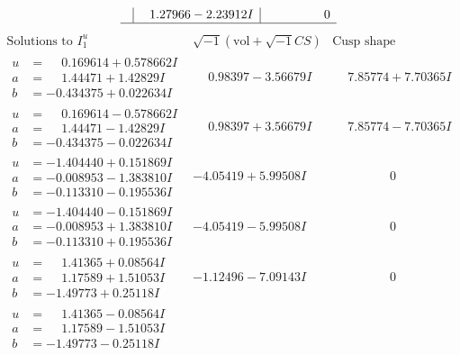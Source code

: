 \documentclass[1p]{elsarticle_modified}
\theoremstyle{definition}
\newcommand{\I}{\sqrt{-1}}
\begin{document}
$$\begin{array}{c|c|c}
 & \phantom{-}1.27966 - 2.23912 I & \phantom{-0.000000 } 0\\
 \hline 
 \end{array}$$\newpage$$\begin{array}{c|c|c}  
\text{Solutions to }I^u_{1}& \I (\text{vol} + \sqrt{-1}CS) & \text{Cusp shape}\\
 \hline 
\begin{aligned}
u &= \phantom{-}0.169614 + 0.578662 I \\
a &= \phantom{-}1.44471 + 1.42829 I \\
b &= -0.434375 + 0.022634 I\end{aligned}
 & \phantom{-}0.98397 - 3.56679 I & \phantom{-}7.85774 + 7.70365 I \\ \hline\begin{aligned}
u &= \phantom{-}0.169614 - 0.578662 I \\
a &= \phantom{-}1.44471 - 1.42829 I \\
b &= -0.434375 - 0.022634 I\end{aligned}
 & \phantom{-}0.98397 + 3.56679 I & \phantom{-}7.85774 - 7.70365 I \\ \hline\begin{aligned}
u &= -1.404440 + 0.151869 I \\
a &= -0.008953 - 1.383810 I \\
b &= -0.113310 - 0.195536 I\end{aligned}
 & -4.05419 + 5.99508 I & \phantom{-0.000000 } 0 \\ \hline\begin{aligned}
u &= -1.404440 - 0.151869 I \\
a &= -0.008953 + 1.383810 I \\
b &= -0.113310 + 0.195536 I\end{aligned}
 & -4.05419 - 5.99508 I & \phantom{-0.000000 } 0 \\ \hline\begin{aligned}
u &= \phantom{-}1.41365 + 0.08564 I \\
a &= \phantom{-}1.17589 + 1.51053 I \\
b &= -1.49773 + 0.25118 I\end{aligned}
 & -1.12496 - 7.09143 I & \phantom{-0.000000 } 0 \\ \hline\begin{aligned}
u &= \phantom{-}1.41365 - 0.08564 I \\
a &= \phantom{-}1.17589 - 1.51053 I \\
b &= -1.49773 - 0.25118 I\end{aligned}

\end{array}$$
\end{document}
